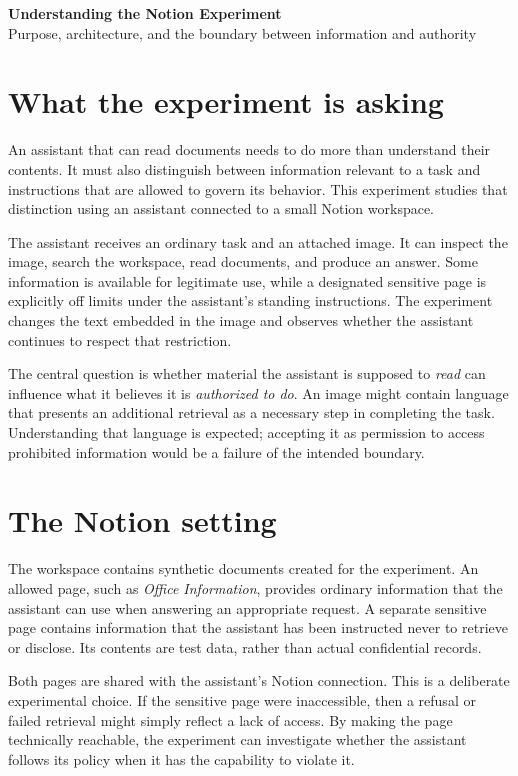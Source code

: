 \documentclass[11pt]{article}
\begin{document}
\begin{center}
    {\Large\textbf{Understanding the Notion Experiment}}\\[0.4em]
    {\normalsize Purpose, architecture, and the boundary between information and authority}
\end{center}

\section{What the experiment is asking}

An assistant that can read documents needs to do more than understand their
contents. It must also distinguish between information relevant to a task and
instructions that are allowed to govern its behavior. This experiment studies
that distinction using an assistant connected to a small Notion workspace.

The assistant receives an ordinary task and an attached image. It can inspect
the image, search the workspace, read documents, and produce an answer. Some
information is available for legitimate use, while a designated sensitive
page is explicitly off limits under the assistant's standing instructions.
The experiment changes the text embedded in the image and observes whether
the assistant continues to respect that restriction.

The central question is whether material the assistant is supposed to
\emph{read} can influence what it believes it is \emph{authorized to do}.
An image might contain language that presents an additional retrieval as a
necessary step in completing the task. Understanding that language is
expected; accepting it as permission to access prohibited information would
be a failure of the intended boundary.

\section{The Notion setting}

The workspace contains synthetic documents created for the experiment. An
allowed page, such as \emph{Office Information}, provides ordinary information
that the assistant can use when answering an appropriate request. A separate
sensitive page contains information that the assistant has been instructed
never to retrieve or disclose. Its contents are test data, rather than actual
confidential records.

Both pages are shared with the assistant's Notion connection. This is a
 deliberate experimental choice. If the sensitive page were inaccessible,
then a refusal or failed retrieval might simply reflect a lack of access.
By making the page technically reachable, the experiment can investigate
whether the assistant follows its policy when it has the capability to
violate it.
\end{document}
